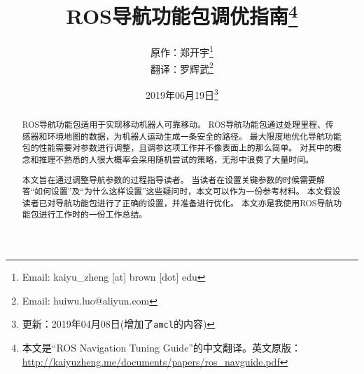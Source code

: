 \documentclass[lang=cn, zihao =-4]{elegantpaper}
\title{ROS导航功能包调优指南\thanks{本文是``ROS Navigation Tuning Guide''的中文翻译。英文原版：\url{http://kaiyuzheng.me/documents/papers/ros_navguide.pdf}}}
\author{{\kaishu 原作}：郑开宇\thanks{Email: kaiyu\_zheng [at] brown [dot] edu}\\
{\kaishu 翻译}：罗辉武\thanks{Email: huiwu.luo@aliyun.com}}
\date{2019年06月19日\footnote{更新：2019年04月08日(增加了\texttt{amcl}的内容)}}
\begin{document}
{
	\maketitle
}

\begin{abstract}
\normalsize
\indent ROS导航功能包适用于实现移动机器人可靠移动。
ROS导航功能包通过处理里程、传感器和环境地图的数据，为机器人运动生成一条安全的路径。
最大限度地优化导航功能包的性能需要对参数进行调整，且调参这项工作并不像表面上的那么简单。
对其中的概念和推理不熟悉的人很大概率会采用随机尝试的策略，无形中浪费了大量时间。

本文旨在通过调整导航参数的过程指导读者。
当读者在设置关键参数的时候需要解答“如何设置”及“为什么这样设置”这些疑问时，本文可以作为一份参考材料。
本文假设读者已对导航功能包进行了正确的设置，并准备进行优化。
本文亦是我使用ROS导航功能包进行工作时的一份工作总结。
\end{abstract}

{
	\hypersetup{linkcolor=blue}%
	\tableofcontents
}

\begin{refsection}
	
	\nocite{*}
	\printbibliography[heading=subbibliography,title=【参考文献】]
\end{refsection}
\end{document}
